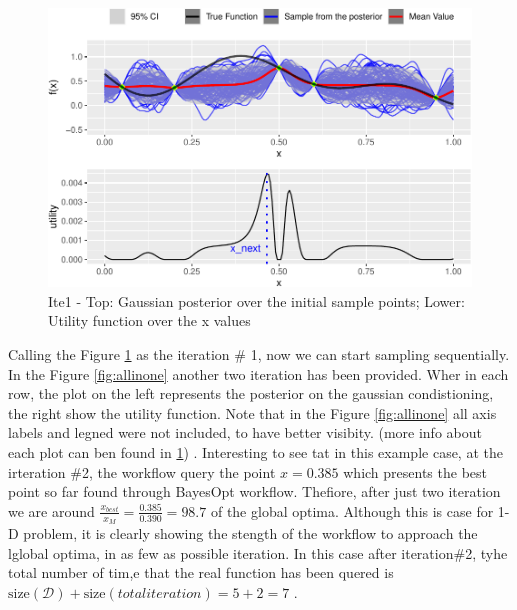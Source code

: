 \documentclass[]{elsarticle} %
\begin{document}
\begin{figure}

\includegraphics[width=1\linewidth,height=0.75\textheight]{0_Paper1_main_files/figure-latex/exampleshow-1} \hfill{}

\caption{Ite1 - Top: Gaussian posterior over the initial sample points; Lower: Utility function over the x values}\label{fig:exampleshow}
\end{figure}

Calling the Figure \ref{fig:exampleshow} as the iteration \# 1, now we can start sampling sequentially. In the Figure \ref{fig:allinone} another two iteration has been provided. Wher in each row, the plot on the left represents the posterior on the gaussian condistioning, the right show the utility function. Note that in the Figure \ref{fig:allinone} all axis labels and legned were not included, to have better visibity. (more info about each plot can ben found in \ref{fig:exampleshow}) . Interesting to see tat in this example case, at the irteration \#2, the workflow query the point \(x=0.385\) which presents the best point so far found through BayesOpt workflow. Thefiore, after just two iteration we are around \(\frac{x_{best}}{x_{M}}=\frac{0.385}{0.390}=98.7%
\) of the global optima. Although this is case for 1-D problem, it is clearly showing the stength of the workflow to approach the lglobal optima, in as few as possible iteration. In this case after iteration\#2, tyhe total number of tim,e that the real function has been quered is \(\text{size}(\mathcal{D}) + \text{size}(total iteration) = 5 + 2=7\) .
\end{document}
